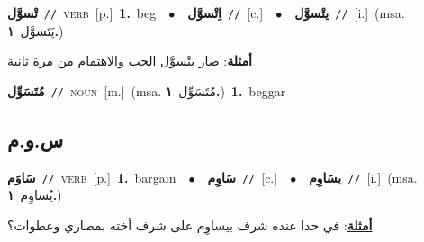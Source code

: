 \documentclass[10pt,a4paper,twoside]{article} %
\begin{document}
\begin{multicols}{2}
{\setlength\topsep{0pt}\textbf{\foreignlanguage{arabic}{تْسوَّل}}\ {\color{gray}\texttt{//}\color{black}}\ \textsc{verb}\ [p.]\ \textbf{1.}~beg\ \ $\bullet$\ \ \setlength\topsep{0pt}\textbf{\foreignlanguage{arabic}{اِتْسوَّل}}\ {\color{gray}\texttt{//}\color{black}}\ [c.]\ \ $\bullet$\ \ \setlength\topsep{0pt}\textbf{\foreignlanguage{arabic}{يتْسوَّل}}\ {\color{gray}\texttt{//}\color{black}}\ [i.]\ \color{gray}(msa. \foreignlanguage{arabic}{يَتَسوَّل}~\foreignlanguage{arabic}{\textbf{١.}})\color{black}\  \begin{flushright}\color{gray}\foreignlanguage{arabic}{\textbf{\underline{\foreignlanguage{arabic}{أمثلة}}}: صار يتْسوَّل الحب والاهتمام من مرة ثانية}\end{flushright}\color{black}} \vspace{2mm}

{\setlength\topsep{0pt}\textbf{\foreignlanguage{arabic}{مُتَسَوِّل}}\ {\color{gray}\texttt{//}\color{black}}\ \textsc{noun}\ [m.]\ \color{gray}(msa. \foreignlanguage{arabic}{مُتَسَوِّل}~\foreignlanguage{arabic}{\textbf{١.}})\color{black}\ \textbf{1.}~beggar\ } \vspace{2mm}

\vspace{-3mm}
\subsection*{\color{blue}\foreignlanguage{arabic}{س.و.م}\color{blue}{}} 

{\setlength\topsep{0pt}\textbf{\foreignlanguage{arabic}{سَاوَم}}\ {\color{gray}\texttt{//}\color{black}}\ \textsc{verb}\ [p.]\ \textbf{1.}~bargain\ \ $\bullet$\ \ \setlength\topsep{0pt}\textbf{\foreignlanguage{arabic}{سَاوِم}}\ {\color{gray}\texttt{//}\color{black}}\ [c.]\ \ $\bullet$\ \ \setlength\topsep{0pt}\textbf{\foreignlanguage{arabic}{يسَاوِم}}\ {\color{gray}\texttt{//}\color{black}}\ [i.]\ \color{gray}(msa. \foreignlanguage{arabic}{يُساوِم}~\foreignlanguage{arabic}{\textbf{١.}})\color{black}\  \begin{flushright}\color{gray}\foreignlanguage{arabic}{\textbf{\underline{\foreignlanguage{arabic}{أمثلة}}}: في حدا عنده شرف بيساوِم على شرف أخته بمصاري وعطوات؟}\end{flushright}\color{black}} \vspace{2mm}


\end{multicols}
\end{document}
